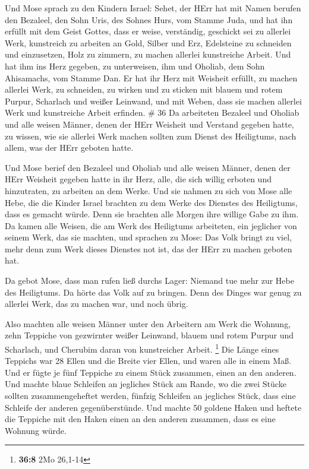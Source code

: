  Und Mose sprach zu den Kindern Israel: Sehet, der HErr hat
mit Namen berufen den Bezaleel, den Sohn Uris, des Sohnes Hurs, vom
Stamme Juda,  und hat ihn erfüllt mit dem Geist Gottes,
dass er weise, verständig, geschickt sei zu allerlei Werk, 
kunstreich zu arbeiten an Gold, Silber und Erz,  Edelsteine
zu schneiden und einzusetzen, Holz zu zimmern, zu machen allerlei
kunstreiche Arbeit.  Und hat ihm ins Herz gegeben, zu
unterweisen, ihm und Oholiab, dem Sohn Ahisamachs, vom Stamme Dan.
 Er hat ihr Herz mit Weisheit erfüllt, zu machen allerlei
Werk, zu schneiden, zu wirken und zu sticken mit blauem und rotem
Purpur, Scharlach und weißer Leinwand, und mit Weben, dass sie machen
allerlei Werk und kunstreiche Arbeit erfinden. \# 36  Da
arbeiteten Bezaleel und Oholiab und alle weisen Männer, denen der HErr
Weisheit und Verstand gegeben hatte, zu wissen, wie sie allerlei Werk
machen sollten zum Dienst des Heiligtums, nach allem, was der HErr
geboten hatte.

 Und Mose berief den Bezaleel und Oholiab und alle weisen
Männer, denen der HErr Weisheit gegeben hatte in ihr Herz, alle, die
sich willig erboten und hinzutraten, zu arbeiten an dem Werke.
 Und sie nahmen zu sich von Mose alle Hebe, die die Kinder
Israel brachten zu dem Werke des Dienstes des Heiligtums, dass es
gemacht würde. Denn sie brachten alle Morgen ihre willige Gabe zu ihm.
 Da kamen alle Weisen, die am Werk des Heiligtums
arbeiteten, ein jeglicher von seinem Werk, das sie machten, 
und sprachen zu Mose: Das Volk bringt zu viel, mehr denn zum Werk dieses
Dienstes not ist, das der HErr zu machen geboten hat.

 Da gebot Mose, dass man rufen ließ durchs Lager: Niemand
tue mehr zur Hebe des Heiligtums. Da hörte das Volk auf zu bringen.
 Denn des Dinges war genug zu allerlei Werk, das zu machen
war, und noch übrig.

 Also machten alle weisen Männer unter den Arbeitern am Werk
die Wohnung, zehn Teppiche von gezwirnter weißer Leinwand, blauem und
rotem Purpur und Scharlach, und Cherubim daran von kunstreicher Arbeit.
\footnote{\textbf{36:8} 2Mo 26,1-14}  Die Länge eines
Teppichs war 28 Ellen und die Breite vier Ellen, und waren alle in einem
Maß.  Und er fügte je fünf Teppiche zu einem Stück
zusammen, einen an den anderen.  Und machte blaue Schleifen
an jegliches Stück am Rande, wo die zwei Stücke sollten zusammengeheftet
werden,  fünfzig Schleifen an jegliches Stück, dass eine
Schleife der anderen gegenüberstünde.  Und machte 50
goldene Haken und heftete die Teppiche mit den Haken einen an den
anderen zusammen, dass es eine Wohnung würde.

